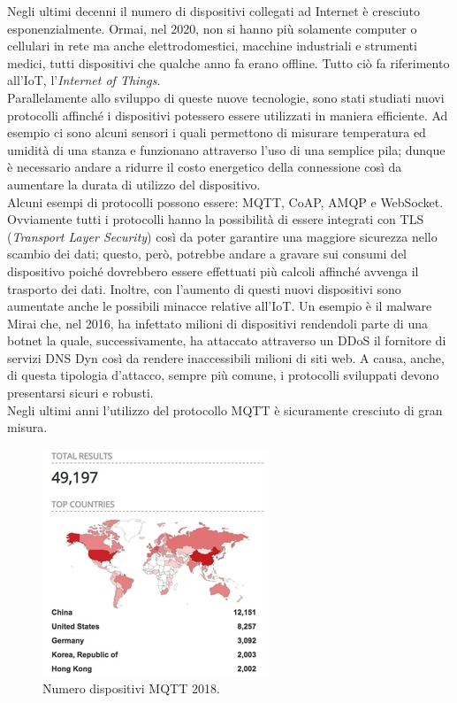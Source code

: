 \documentclass[binding=0.6cm,TFA]{sapthesis}
\begin{document}
\begin{large}
Negli ultimi decenni il numero di dispositivi collegati ad Internet è cresciuto esponenzialmente. Ormai, nel 2020, non si hanno più solamente computer o cellulari in rete ma anche elettrodomestici, macchine industriali e strumenti medici, tutti dispositivi che qualche anno fa erano offline. Tutto ciò fa riferimento all'IoT, l'\textit{Internet of Things}. \\
Parallelamente allo sviluppo di queste nuove tecnologie, sono stati studiati nuovi protocolli affinché i dispositivi potessero essere utilizzati in maniera efficiente. Ad esempio ci sono alcuni sensori i quali permettono di misurare temperatura ed umidità di una stanza e funzionano attraverso l'uso di una semplice pila; dunque è necessario andare a ridurre il costo energetico della connessione così da aumentare la durata di utilizzo del dispositivo. \\
Alcuni esempi di protocolli possono essere: MQTT, CoAP, AMQP e WebSocket. Ovviamente tutti i protocolli hanno la possibilità di essere integrati con TLS (\textit{Transport Layer Security}) così da poter garantire una maggiore sicurezza nello scambio dei dati; questo, però, potrebbe andare a gravare sui consumi del dispositivo poiché dovrebbero essere effettuati più calcoli affinché avvenga il trasporto dei dati. Inoltre, con l'aumento di questi nuovi dispositivi sono aumentate anche le possibili minacce relative all'IoT. Un esempio è il malware Mirai \cite{wiki:Mirai} che, nel 2016, ha infettato milioni di dispositivi rendendoli parte di una botnet la quale, successivamente, ha attaccato attraverso un DDoS il fornitore di servizi DNS Dyn così da rendere inaccessibili milioni di siti web. A causa, anche, di questa tipologia d'attacco, sempre più comune, i protocolli sviluppati devono presentarsi sicuri e robusti.\\

Negli ultimi anni l'utilizzo del protocollo MQTT è sicuramente cresciuto di gran misura.
\begin{figure}[h]
\centering
\includegraphics[scale=0.8]{images/mqtt-2018numbers.jpg}
\caption{Numero dispositivi MQTT 2018.}
\label{fig:mqtt2018}
\end{figure}


\end{large}
\end{document}
